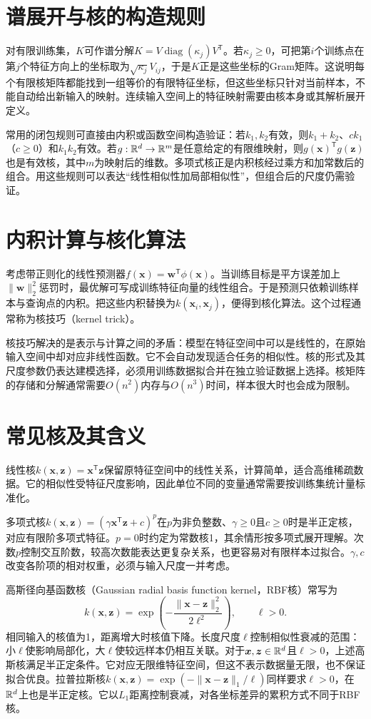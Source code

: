 \section{谱展开与核的构造规则}
对有限训练集，$K$可作谱分解$K=V\operatorname{diag}(\kappa_j)V^{\mathsf T}$。若$\kappa_j\geq0$，可把第$i$个训练点在第$j$个特征方向上的坐标取为$\sqrt{\kappa_j}V_{ij}$，于是$K$正是这些坐标的Gram矩阵。这说明每个有限核矩阵都能找到一组等价的有限特征坐标，但这些坐标只针对当前样本，不能自动给出新输入的映射。连续输入空间上的特征映射需要由核本身或其解析展开定义。

常用的闭包规则可直接由内积或函数空间构造验证：若$k_1,k_2$有效，则$k_1+k_2$、$c k_1$（$c\geq0$）和$k_1k_2$有效。若$g:\mathbb{R}^d\to\mathbb{R}^m$是任意给定的有限维映射，则$g(\bm x)^{\mathsf T}g(\bm z)$也是有效核，其中$m$为映射后的维数。多项式核正是内积核经过乘方和加常数后的组合。用这些规则可以表达“线性相似性加局部相似性”，但组合后的尺度仍需验证。

\section{内积计算与核化算法}
考虑带正则化的线性预测器$f(\bm x)=\bm w^{\mathsf T}\phi(\bm x)$。当训练目标是平方误差加上$\|\bm w\|_2^2$惩罚时，最优解可写成训练特征向量的线性组合。于是预测只依赖训练样本与查询点的内积。把这些内积替换为$k(\bm x_i,\bm x_j)$，便得到核化算法。这个过程通常称为核技巧（kernel trick）。

核技巧解决的是表示与计算之间的矛盾：模型在特征空间中可以是线性的，在原始输入空间中却对应非线性函数。它不会自动发现适合任务的相似性。核的形式及其尺度参数仍表达建模选择，必须用训练数据拟合并在独立验证数据上选择。核矩阵的存储和分解通常需要$O(n^2)$内存与$O(n^3)$时间，样本很大时也会成为限制。

\section{常见核及其含义}
线性核$k(\bm x,\bm z)=\bm x^{\mathsf T}\bm z$保留原特征空间中的线性关系，计算简单，适合高维稀疏数据。它的相似性受特征尺度影响，因此单位不同的变量通常需要按训练集统计量标准化。

多项式核$k(\bm x,\bm z)=(\gamma\bm x^{\mathsf T}\bm z+c)^p$在$p$为非负整数、$\gamma\ge0$且$c\ge0$时是半正定核，对应有限阶多项式特征。$p=0$时约定为常数核1，其余情形按多项式展开理解。次数$p$控制交互阶数，较高次数能表达更复杂关系，也更容易对有限样本过拟合。$\gamma,c$改变各阶项的相对权重，必须与输入尺度一并考虑。

高斯径向基函数核（Gaussian radial basis function kernel，RBF核）常写为
\begin{equation}
 k(\bm x,\bm z)=\exp\left(-\frac{\|\bm x-\bm z\|_2^2}{2\ell^2}\right),\qquad \ell>0.
\end{equation}
相同输入的核值为1，距离增大时核值下降。长度尺度$\ell$控制相似性衰减的范围：小$\ell$使影响局部化，大$\ell$使较远样本仍相互关联。对于$\bm x,\bm z\in\mathbb{R}^d$且$\ell>0$，上述高斯核满足半正定条件。它对应无限维特征空间，但这不表示数据量无限，也不保证拟合优良。拉普拉斯核$k(\bm x,\bm z)=\exp(-\|\bm x-\bm z\|_1/\ell)$同样要求$\ell>0$，在$\mathbb{R}^d$上也是半正定核。它以$L_1$距离控制衰减，对各坐标差异的累积方式不同于RBF核。

